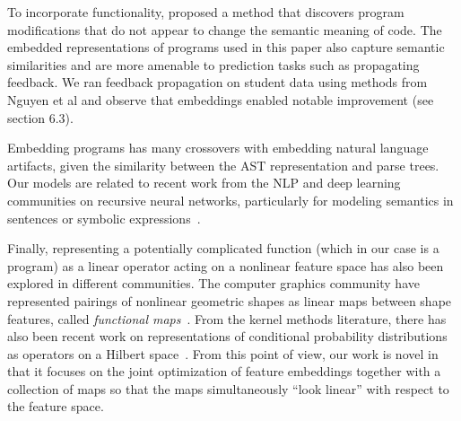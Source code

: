 To incorporate functionality,
\cite{nguyen14} proposed a method that discovers program modifications that do not appear to change the semantic meaning of code. 
The embedded representations of programs used in this paper also capture semantic similarities and are more amenable to prediction tasks such as propagating feedback. 
We ran feedback propagation on student data using methods from Nguyen et al and observe that embeddings enabled notable improvement (see section 6.3).

Embedding programs has many crossovers with embedding natural language artifacts, given the similarity between the AST representation and parse trees. Our models are related to recent work from the NLP and deep learning communities on recursive neural networks, particularly
for modeling semantics in sentences or symbolic expressions~\cite{socher2013recursive,socher2011semi,zaremba2014learningb,bowman2013can}.

Finally, representing a potentially 
complicated function (which in our case is a program) as
a linear operator acting on a nonlinear feature space has also
been explored in different communities.
The computer graphics community
have represented pairings of nonlinear geometric
shapes as linear maps between shape features, called \emph{functional maps}~\cite{ovsjanikov2012functional,ovsjanikov2013analysis}.
From the kernel methods literature, there has also been recent
work on representations of conditional probability
 distributions as operators on a Hilbert space~\cite{song2013kernel,song2009hilbert}. 
From this point of view, our work is novel in that it
focuses on the joint optimization of feature embeddings
together with a collection of maps
so that the maps simultaneously ``look linear''
with respect to the feature space.



